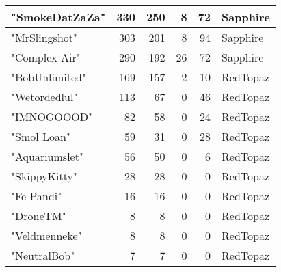 \documentclass{article}
\begin{document}
\begin{table}[htbp]
\begin{tabular}{|l|r|r|r|r|l|}
"SmokeDatZaZa" & 330 & 250 & 8 & 72 & Sapphire \\ \hline
"MrSlingshot" & 303 & 201 & 8 & 94 & Sapphire \\ \hline
"Complex Air" & 290 & 192 & 26 & 72 & Sapphire \\ \hline
"BobUnlimited" & 169 & 157 & 2 & 10 & RedTopaz \\ \hline
"Wetordedlul" & 113 & 67 & 0 & 46 & RedTopaz \\ \hline
"IMNOGOOOD" & 82 & 58 & 0 & 24 & RedTopaz \\ \hline
"Smol Loan" & 59 & 31 & 0 & 28 & RedTopaz \\ \hline
"Aquariumslet" & 56 & 50 & 0 & 6 & RedTopaz \\ \hline
"SkippyKitty" & 28 & 28 & 0 & 0 & RedTopaz \\ \hline
"Fe Pandi" & 16 & 16 & 0 & 0 & RedTopaz \\ \hline
"DroneTM" & 8 & 8 & 0 & 0 & RedTopaz \\ \hline
"Veldmenneke" & 8 & 8 & 0 & 0 & RedTopaz \\ \hline
"NeutralBob" & 7 & 7 & 0 & 0 & RedTopaz \\ \hline
\end{tabular}
\end{table}
\end{document}
